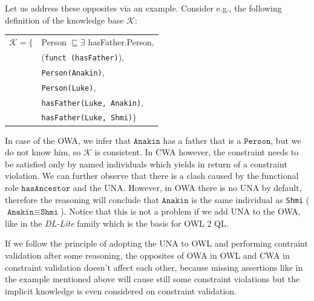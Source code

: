 \documentclass{llncs}
\newcommand{\ms}[1]{\texttt{#1}}
\newcommand{\tb}[1]{\todo[size=\small, color=green!40]{\textbf{Thomas:} #1}}
\newenvironment{DL}{
  \scriptsize
  \sffamily
  \vspace{0.3cm}
  \begin{tabular}{r l}

}{
  \end{tabular}
  \linebreak
}
\begin{document}
Let us address these opposites via an example. Consider e.g., the following definition of the knowledge base $\mathcal{K}$:


\begin{center}
\begin{DL} 
$\mathcal{K}=\{$ & Person $\sqsubseteq \exists$ hasFather.Person, \\
 &(\ms{funct (hasFather)}),\\
 &\ms{Person(Anakin)},\\
  &\ms{Person(Luke)},\\
 &\ms{hasFather(Luke, Anakin)},\\ 
 &\ms{hasFather(Luke, Shmi)}$\}$
\end{DL}
\end{center}


In case of the OWA, we infer that $\ms{Anakin}$ has a father that is a $\ms{Person}$, but we do not know him, so $\mathcal{K}$ is consistent. In CWA however, the constraint needs to be satisfied only by named individuals which yields in return of a constraint violation. We can further observe that there is a clash caused by the functional role $\ms{hasAncestor}$ and the UNA. However, in OWA there is no UNA by default, therefore the reasoning will conclude that $\ms{Anakin}$ is the same individual as \ms{Shmi} ($\ms{Anakin} \equiv \ms{Shmi}$). Notice that this is not a problem if we add UNA to the OWA, like in the \textit{DL-Lite} family \cite{Calvanese2007,Artale2009} which is the basis for OWL 2 QL.

If we follow the principle of adopting the UNA to OWL and performing contraint validation after some reasoning, the opposites of OWA in OWL and CWA in constraint validation doesn't affect each other, because missing assertions like in the example mentioned above will cause still some constraint violations but the implicit knowledge is even considered on constraint validation.

%
%
\end{document}
